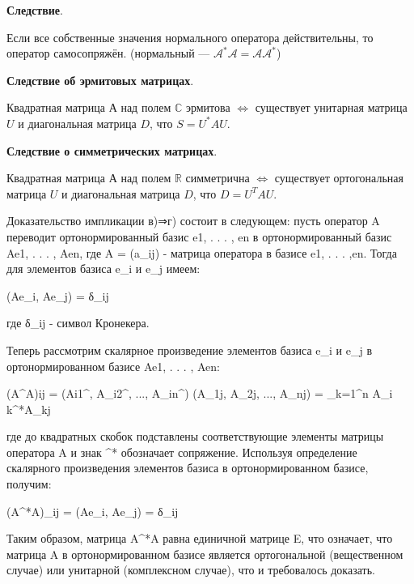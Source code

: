 \documentclass[a4paper]{article}
\begin{document}
\begin{htheorem}\textbf{Следствие}.

Если все собственные значения нормального оператора действительны, то оператор самосопряжён. (нормальный --- $\mathcal{A}^* \mathcal{A} = \mathcal{A} \mathcal{A}^*$)
\end{htheorem}

\begin{htheorem}\textbf{Следствие об эрмитовых матрицах}.

Квадратная матрица А над полем $\mathbb{C}$ эрмитова $\Leftrightarrow$ существует унитарная матрица $U$ и диагональная матрица $D$, что $S = U^* A U$.
\end{htheorem}

\begin{htheorem}\textbf{Следствие о симметрических матрицах}.

Квадратная матрица А над полем $\mathbb{R}$ симметрична $\Leftrightarrow$ существует ортогональная матрица $U$ и диагональная матрица $D$, что $D = U^T A U$.
\end{htheorem}

Доказательство импликации в)⇒г) состоит в следующем: пусть оператор A переводит ортонормированный базис e1, . . . , en в ортонормированный базис Ae1, . . . , Aen, где A = (a_ij) - матрица оператора в базисе e1, . . . ,en. Тогда для элементов базиса e_i и e_j имеем:

(Ae_i, Ae_j) = δ_ij

где δ_ij - символ Кронекера.

Теперь рассмотрим скалярное произведение элементов базиса e_i и e_j в ортонормированном базисе Ae1, . . . , Aen:

(A^A){ij} = (A{i1}^, A_{i2}^, ..., A_{in}^) (A_{1j}, A_{2j}, ..., A_{nj}) = \sum_{k=1}^{n} A_{i k}^*A_{kj}

где до квадратных скобок подставлены соответствующие элементы матрицы оператора A и знак ^* обозначает сопряжение. Используя определение скалярного произведения элементов базиса в ортонормированном базисе, получим:

(A^*A)_{ij} = (Ae_i, Ae_j) = δ_ij

Таким образом, матрица A^*A равна единичной матрице E, что означает, что матрица A в ортонормированном базисе является ортогональной (вещественном случае) или унитарной (комплексном случае), что и требовалось доказать.
\end{document}
